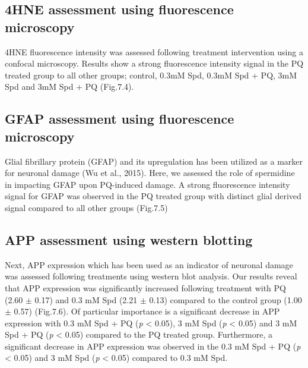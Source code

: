 \subsection{4HNE assessment using fluorescence microscopy}
4HNE fluorescence intensity was assessed following treatment intervention using a confocal microscopy. Results show a strong fluorescence intensity signal in the PQ treated group to all other groups; control, 0.3mM Spd, 0.3mM Spd + PQ, 3mM Spd and 3mM Spd + PQ (Fig.7.4).


\subsection{GFAP assessment using fluorescence microscopy} 
Glial fibrillary protein (GFAP) and its upregulation has been utilized as a marker for neuronal damage (Wu et al., 2015). Here, we assessed the role of spermidine in impacting GFAP upon PQ-induced damage. A strong fluorescence intensity signal for GFAP was observed in the PQ treated group with distinct glial derived signal compared to all other groups (Fig.7.5)


\subsection{APP assessment using western blotting}
Next, APP expression which has been used as an indicator of neuronal damage was assessed following treatments using western blot analysis. Our results reveal that APP expression was significantly increased following treatment with PQ (2.60 $\pm$ 0.17) and 0.3 mM Spd (2.21 $\pm$ 0.13) compared to the control group (1.00 $\pm$ 0.57) (Fig.7.6). Of particular importance is a significant decrease in APP expression with 0.3 mM Spd + PQ (\textit{p} < 0.05), 3 mM Spd (\textit{p} < 0.05) and 3 mM Spd + PQ (\textit{p} < 0.05) compared to the PQ treated group. Furthermore, a significant decrease in APP expression was observed in the 0.3 mM Spd + PQ (\textit{p} < 0.05) and 3 mM Spd (\textit{p} < 0.05) compared to 0.3 mM Spd. 


